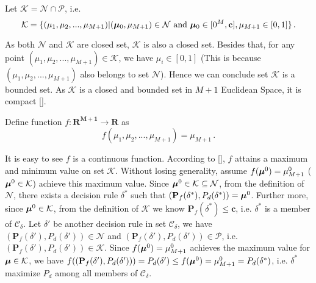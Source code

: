\documentclass[12pt,journal,a4paper,twoside,onecolumn]{IEEEtran}
\begin{document}
\begin{spacing}{2}
Let $\mathcal{K} = \mathcal{N} \cap \mathcal{P}$, i.e.
\begin{equation}
\label{apr14a0}
\mathcal{K} = \{
(\mu_1, \mu_2, ..., \mu_{M+1}) | (\boldsymbol{\mu}_0, \mu_{M+1}) \in \mathcal{N} \text{ and } \boldsymbol{\mu}_0 \in [0^M, \mathbf{c}], \mu_{M+1} \in [0, 1]
\}\,.
\end{equation}

As both $\mathcal{N}$ and $\mathcal{K}$ are closed set, $\mathcal{K}$ is also a closed set. Besides that, for any point  $(\mu_1, \mu_2, ..., \mu_{M+1}) \in \mathcal{K}$, we have $\mu_i \in [0, 1]$ (This is because $(\mu_1, \mu_2, ..., \mu_{M+1})$ also belongs to set $\mathcal{N}$). Hence we can conclude set $\mathcal{K}$ is a bounded set. As $\mathcal{K}$ is a closed and bounded set in $M+1$ Euclidean Space, it is compact []. 

Define function $f: \mathbf{R^{M+1}} \rightarrow \mathbf{R}$ as
\begin{equation}
f(\mu_1, \mu_2, ..., \mu_{M+1}) = \mu_{M+1}\,.
\end{equation}

It is easy to see $f$ is a continuous function. According to [], $f$ attains a maximum and minimum value on set $\mathcal{K}$. 
Without losing generality, assume $f(\boldsymbol{\mu}^0)  = \mu_{M+1}^0$ ($\boldsymbol{\mu}^0 \in \mathcal{K}$) achieve this maximum value. 
Since $\boldsymbol{\mu}^0 \in \mathcal{K} \subseteq  \mathcal{N}$, from the definition of $\mathcal{N}$, there exists a decision rule $\delta^\ast$ such that $(\mathbf{P}_{f}(\delta^\ast), P_d(\delta^\ast)) = \boldsymbol{\mu}^0$.  
Further more, since $\boldsymbol{\mu}^0 \in \mathcal{K} $, from the definition of $\mathcal{K}$ we know $\mathbf{P}_{f}(\delta^\ast) \leq \mathbf{c}$, 
i.e. $\delta^\ast$ is a member of $\mathcal{C}_\delta$. 
Let $\delta' $ be another decision rule in set $\mathcal{C}_\delta$, we have $(\mathbf{P}_f(\delta'), P_d(\delta')) \in \mathcal{N}$ and $(\mathbf{P}_f(\delta'), P_d(\delta')) \in \mathcal{P}$, i.e. $(\mathbf{P}_f(\delta'), P_d(\delta')) \in \mathcal{K}$.
Since $f(\boldsymbol{\mu}^0) = \mu_{M+1}^0$ achieves the maximum value for $\boldsymbol{\mu} \in \mathcal{K}$, we have
$f((\mathbf{P}_f(\delta'), P_d(\delta')))  = P_d(\delta') \leq  f(\boldsymbol{\mu}^0) = \mu_{M+1}^0 =  P_d(\delta^\ast)$, i.e. $\delta^\ast$ maximize $P_d$ among all members of $\mathcal{C}_\delta$. 
 \end{spacing}
 
\end{document}
